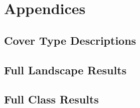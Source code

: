 \chapter{Appendices}

\section{Cover Type Descriptions}
\label{sec:covertypedesc}

\section{Full Landscape Results}
\label{sec:full-land-results}

\section{Full Class Results}
\label{sec:full-class-results}